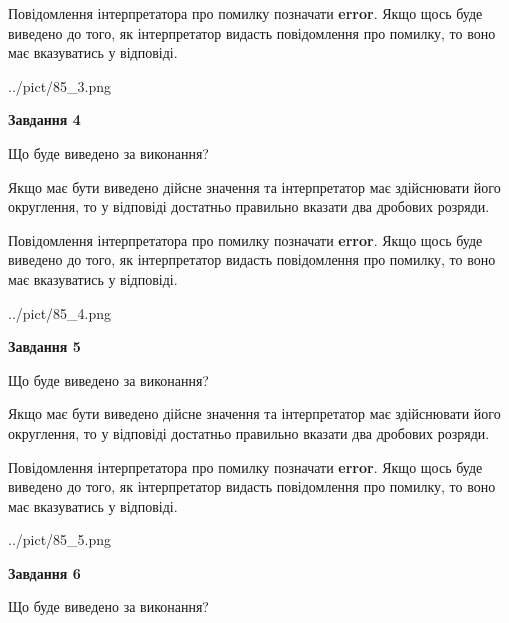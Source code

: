 \documentclass[12pt, ukrainian]{article}
\begin{document}
{\begin {Large}
Повідомлення інтерпретатора про помилку позначати \textbf{error}.
Якщо щось буде виведено до того, як інтерпретатор видасть повідомлення про помилку, 
то воно має вказуватись у відповіді. \par

\begin{center}
	{../pict/85_3.png}
\end{center}
\newpage

{\begin {center}\textbf{Завдання 4}\end {center}}\par
Що буде виведено за виконання? \par

Якщо має бути виведено дійсне значення та інтерпретатор має здійснювати його округлення, 
то у відповіді достатньо правильно вказати два дробових розряди.

Повідомлення інтерпретатора про помилку позначати \textbf{error}.
Якщо щось буде виведено до того, як інтерпретатор видасть повідомлення про помилку, 
то воно має вказуватись у відповіді. \par

\begin{center}
	{../pict/85_4.png}
\end{center}
\newpage

{\begin {center}\textbf{Завдання 5}\end {center}}\par
Що буде виведено за виконання? \par

Якщо має бути виведено дійсне значення та інтерпретатор має здійснювати його округлення, 
то у відповіді достатньо правильно вказати два дробових розряди.

Повідомлення інтерпретатора про помилку позначати \textbf{error}.
Якщо щось буде виведено до того, як інтерпретатор видасть повідомлення про помилку, 
то воно має вказуватись у відповіді. \par

\begin{center}
	{../pict/85_5.png}
\end{center}
\newpage

{\begin {center}\textbf{Завдання 6}\end {center}}\par
Що буде виведено за виконання? \par


\end{Large}}
\end{document}
